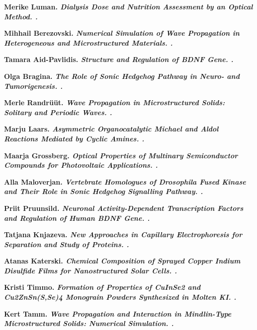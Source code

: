 \begin{list}
\item \bf Merike Luman. \it Dialysis Dose and Nutrition Assessment by an
  Optical Method. .

\item \bf Mihhail Berezovski. \it Numerical Simulation of Wave Propagation in
  Heterogeneous and Microstructured Materials. .

\item \bf Tamara Aid-Pavlidis. \it Structure and Regulation of BDNF
  Gene. .

\item \bf Olga Bragina. \it The Role of Sonic Hedgehog Pathway in Neuro- and
  Tumorigenesis. .

\item \bf Merle Randr\"u\"ut. \it Wave Propagation in Microstructured Solids:
  Solitary and Periodic Waves. .

\item \bf Marju Laars. \it Asymmetric Organocatalytic Michael and Aldol
  Reactions Mediated by Cyclic Amines. .

\item \bf Maarja Grossberg. \it Optical Properties of Multinary Semiconductor
  Compounds for Photovoltaic Applications. .

\item \bf Alla Maloverjan. \it Vertebrate Homologues of Drosophila Fused
  Kinase and Their Role in Sonic Hedgehog Signalling Pathway. .

\item \bf Priit Pruunsild. \it Neuronal Activity-Dependent Transcription
  Factors and Regulation of Human BDNF Gene. .

\item \bf Tatjana Knjazeva. \it New Approaches in Capillary Electrophoresis
  for Separation and Study of Proteins. .

\item \bf Atanas Katerski. \it Chemical Composition of Sprayed Copper Indium
  Disulfide Films for Nanostructured Solar Cells. .

\item \bf Kristi Timmo. \it Formation of Properties of CuInSe2 and
  Cu2ZnSn(S,Se)4 Monograin Powders Synthesized in Molten KI. .

\item \bf Kert Tamm. \it Wave Propagation and Interaction in Mindlin-Type
  Microstructured Solids: Numerical Simulation. .


\end{list}
